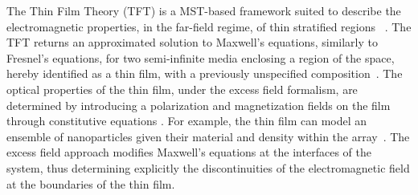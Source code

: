 
The Thin Film Theory (TFT) is a MST-based framework suited to describe the electromagnetic  properties, in the far-field regime, of thin stratified regions ~\cite{bedeaux_optical_2004}. The TFT returns an approximated solution to Maxwell's equations, similarly to Fresnel's equations, for two semi-infinite media enclosing a region of the space, hereby identified as a thin film, with a previously unspecified composition~\cite{bedeaux_optical_2004,cuanalo_phase_2024,svedendahl_fano_2012}. The optical properties of the thin film, under the excess field formalism, are determined by introducing a polarization and magnetization  fields on the film through  constitutive equations \cite{bedeaux_optical_2004}. For example, the thin film can model an  ensemble of nanoparticles  given their material and density within the array~\cite{haarmans_optical_1995,lazzari_granfilm_2002}. The excess field approach modifies Maxwell's equations at the interfaces of the system, thus determining explicitly the discontinuities of the electromagnetic field at the boundaries of the thin film.

